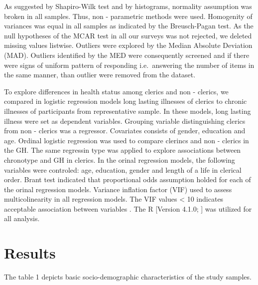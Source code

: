 \documentclass[ijerph,article,accept,moreauthors,pdftex]{mdpi}
\begin{document}
As suggested by Shapiro-Wilk test and by histograms, normality
assumption was broken in all samples. Thus, non - parametric methods
were used. Homogenity of variances was equal in all samples as indicated
by the Breusch-Pagan test. As the null hypotheses of the MCAR test in
all our surveys was not rejected, we deleted missing values listwise.
Outliers were explored by the Median Absolute Deviation (MAD). Outliers
identified by the MED were consequently screened and if there were signs
of uniform pattern of responding i.e.~answering the number of items in
the same manner, than outlier were removed from the dataset.

To explore differences in health status among clerics and non - clerics,
we compared in logistic regression models long lasting illnesses of
clerics to chronic illnesses of participants from representative sample.
In these models, long lasting illness were set as dependent variables.
Grouping variable distinguishing clerics from non - clerics was a
regressor. Covariates consists of gender, education and age. Ordinal
logistic regression was used to compare clerincs and non - clerics in
the GH. The same regressin type was applied to explore associations
between chronotype and GH in clerics. In the orinal regression models,
the following variables were controled: age, education, gender and
length of a life in clerical order. Brant test indicated that
proportional odds assumption holded for each of the orinal regression
models. Variance inflation factor (VIF) used to assess multicolinearity
in all regression models. The VIF values \textless{} 10 indicates
acceptable association between variables \citep{TAY2017}. The R
{[}Version 4.1.0; \citet{R-base}{]} was utilized for all analysis.

\hypertarget{results}{%
\section{Results}\label{results}}

The table 1 depicts basic socio-demographic characteristics of the study
samples.

\newpage
\end{document}

